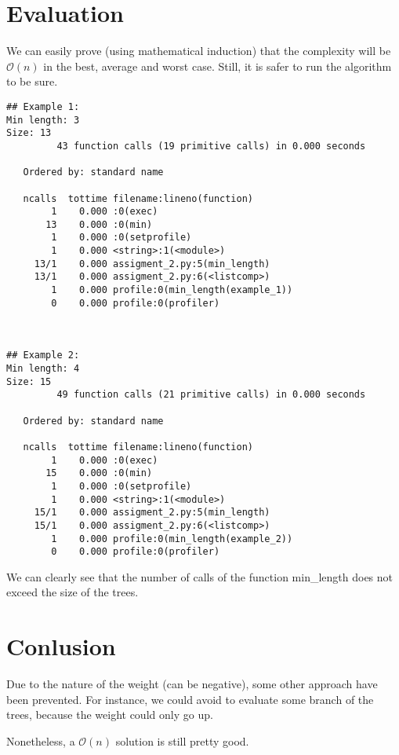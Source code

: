 \section{Evaluation}
	We can easily prove (using mathematical induction) that the complexity will be $\mathcal{O}(n)$ in the best, average and worst case.
	Still, it is safer to run the algorithm to be sure.

\begin{lstlisting}
## Example 1:
Min length: 3
Size: 13
         43 function calls (19 primitive calls) in 0.000 seconds

   Ordered by: standard name

   ncalls  tottime filename:lineno(function)
        1    0.000 :0(exec)
       13    0.000 :0(min)
        1    0.000 :0(setprofile)
        1    0.000 <string>:1(<module>)
     13/1    0.000 assigment_2.py:5(min_length)
     13/1    0.000 assigment_2.py:6(<listcomp>)
        1    0.000 profile:0(min_length(example_1))
        0    0.000 profile:0(profiler)



## Example 2:
Min length: 4
Size: 15
         49 function calls (21 primitive calls) in 0.000 seconds

   Ordered by: standard name

   ncalls  tottime filename:lineno(function)
        1    0.000 :0(exec)
       15    0.000 :0(min)
        1    0.000 :0(setprofile)
        1    0.000 <string>:1(<module>)
     15/1    0.000 assigment_2.py:5(min_length)
     15/1    0.000 assigment_2.py:6(<listcomp>)
        1    0.000 profile:0(min_length(example_2))
        0    0.000 profile:0(profiler)
\end{lstlisting}
	We can clearly see that the number of calls of the function min\_length does not exceed the size of the trees.

\section{Conlusion}
	Due to the nature of the weight (can be negative), some other approach have been prevented. For instance, we could avoid to evaluate some branch of the trees, because the weight could only go up.

	Nonetheless, a $\mathcal{O}(n)$ solution is still pretty good.